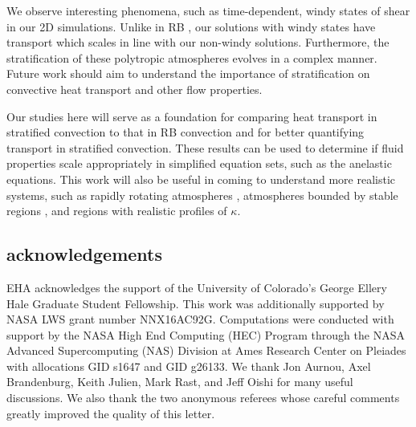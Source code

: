 \documentclass[aps, prl, twocolumn, nofootinbib, groupedaddress, amsfonts, amssymb, amsmath]{revtex4-1}
\begin{document}
We observe interesting phenomena, such as time-dependent, windy
states of shear in our 2D simulations.  
Unlike in RB \cite{goluskin&all2014}, our solutions with
windy states have transport which scales in line with our non-windy solutions.
Furthermore, the stratification of 
these polytropic atmospheres evolves in a complex
manner.  Future work should aim to 
understand the importance of stratification on
convective heat transport and other flow properties.

Our studies here will serve as a foundation for 
comparing heat transport in stratified convection
to that in RB convection \cite{johnston&doering2009}
and for better quantifying transport in stratified convection.  
These results can be used to determine if fluid properties
scale appropriately in simplified equation sets, 
such as the anelastic equations.
This work will also be useful in coming to understand more realistic systems, 
such as rapidly rotating atmospheres \cite{julien&all2012},
atmospheres bounded by stable regions \cite{hurlburt&all1986}, 
and regions with realistic profiles of $\kappa$.



\subsection{acknowledgements}
EHA acknowledges the support of the University of Colorado's George 
Ellery Hale Graduate Student Fellowship.
This work was additionally supported by  NASA LWS grant number NNX16AC92G.  
Computations were conducted 
with support by the NASA High End Computing (HEC) Program through the NASA 
Advanced Supercomputing (NAS) Division at Ames Research Center on Pleiades
with allocations GID s1647 and GID g26133.
We thank Jon Aurnou, Axel Brandenburg, Keith Julien, Mark Rast, and Jeff Oishi 
for many useful discussions. We also thank the two anonymous referees whose
careful comments greatly improved the quality of this letter.


\end{document}
